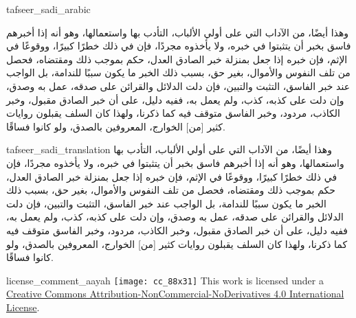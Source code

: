 \begin{taggedblock}{tafseer_sadi_arabic}
\begin{Arabic}
وهذا أيضًا، من الآداب التي على أولي الألباب، التأدب بها واستعمالها، وهو أنه إذا أخبرهم فاسق بخبر أن يتثبتوا في خبره، ولا يأخذوه مجردًا، فإن في ذلك خطرًا كبيرًا، ووقوعًا في الإثم، فإن خبره إذا جعل بمنزلة خبر الصادق العدل، حكم بموجب ذلك ومقتضاه، فحصل من تلف النفوس والأموال، بغير حق، بسبب ذلك الخبر ما يكون سببًا للندامة، بل الواجب عند خبر الفاسق، التثبت والتبين، فإن دلت الدلائل والقرائن على صدقه، عمل به وصدق، وإن دلت على كذبه، كذب، ولم يعمل به، ففيه دليل، على أن خبر الصادق مقبول، وخبر الكاذب، مردود، وخبر الفاسق متوقف فيه كما ذكرنا، ولهذا كان السلف يقبلون روايات كثير
[من]
الخوارج، المعروفين بالصدق، ولو كانوا فساقًا.
\end{Arabic}
\end{taggedblock}
\begin{taggedblock}{tafseer_sadi_translation}
وهذا أيضًا، من الآداب التي على أولي الألباب، التأدب بها واستعمالها، وهو أنه إذا أخبرهم فاسق بخبر أن يتثبتوا في خبره، ولا يأخذوه مجردًا، فإن في ذلك خطرًا كبيرًا، ووقوعًا في الإثم، فإن خبره إذا جعل بمنزلة خبر الصادق العدل، حكم بموجب ذلك ومقتضاه، فحصل من تلف النفوس والأموال، بغير حق، بسبب ذلك الخبر ما يكون سببًا للندامة، بل الواجب عند خبر الفاسق، التثبت والتبين، فإن دلت الدلائل والقرائن على صدقه، عمل به وصدق، وإن دلت على كذبه، كذب، ولم يعمل به، ففيه دليل، على أن خبر الصادق مقبول، وخبر الكاذب، مردود، وخبر الفاسق متوقف فيه كما ذكرنا، ولهذا كان السلف يقبلون روايات كثير
[من]
الخوارج، المعروفين بالصدق، ولو كانوا فساقًا.
\end{taggedblock}
\begin{taggedblock}{license_comment_aayah}
\texttt{[image: cc\_88x31]}
This work is licensed under a 
\href{http://creativecommons.org/licenses/by-nc-nd/4.0/}{Creative Commons Attribution-NonCommercial-NoDerivatives 4.0 International License}.
\end{taggedblock}
\begin{comment}
Please use the following for footnotes:- Sample\footnoteQ{Text of Qur'an footnote goes here.}.
Sample\footnoteT{Text of Tafseer footnote goes here.}.
\end{comment}